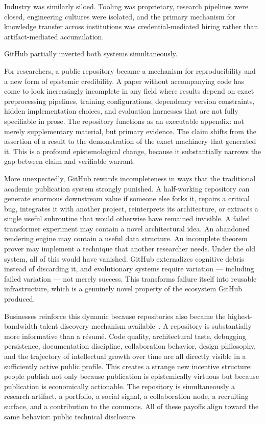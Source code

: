 \documentclass[12pt]{article}
\begin{document}
Industry was similarly siloed. Tooling was proprietary, research pipelines were
closed, engineering cultures were isolated, and the primary mechanism for
knowledge transfer across institutions was credential-mediated hiring rather than
artifact-mediated accumulation.

GitHub partially inverted both systems simultaneously.

For researchers, a public repository became a mechanism for reproducibility and
a new form of epistemic credibility. A paper without accompanying code has come
to look increasingly incomplete in any field where results depend on exact
preprocessing pipelines, training configurations, dependency version constraints,
hidden implementation choices, and evaluation harnesses that are not fully
specifiable in prose. The repository functions as an executable appendix: not
merely supplementary material, but primary evidence. The claim shifts from the
assertion of a result to the demonstration of the exact machinery that generated
it. This is a profound epistemological change, because it substantially narrows
the gap between claim and verifiable warrant.

More unexpectedly, GitHub rewards incompleteness in ways that the traditional
academic publication system strongly punished. A half-working repository can
generate enormous downstream value if someone else forks it, repairs a critical
bug, integrates it with another project, reinterprets its architecture, or
extracts a single useful subroutine that would otherwise have remained invisible.
A failed transformer experiment may contain a novel architectural idea. An
abandoned rendering engine may contain a useful data structure. An incomplete
theorem prover may implement a technique that another researcher needs. Under
the old system, all of this would have vanished. GitHub externalizes cognitive
debris instead of discarding it, and evolutionary systems require variation ---
including failed variation --- not merely success. This transforms failure itself
into reusable infrastructure, which is a genuinely novel property of the
ecosystem GitHub produced.

Businesses reinforce this dynamic because repositories also became the
highest-bandwidth talent discovery mechanism available~\cite{benkler2006,raymond1999}.
A repository is substantially more informative than a r\'esum\'e. Code quality, architectural
taste, debugging persistence, documentation discipline, collaboration behavior,
design philosophy, and the trajectory of intellectual growth over time are all
directly visible in a sufficiently active public profile. This creates a strange
new incentive structure: people publish not only because publication is
epistemically virtuous but because publication is economically actionable. The
repository is simultaneously a research artifact, a portfolio, a social signal,
a collaboration node, a recruiting surface, and a contribution to the commons.
All of these payoffs align toward the same behavior: public technical disclosure.
\end{document}
